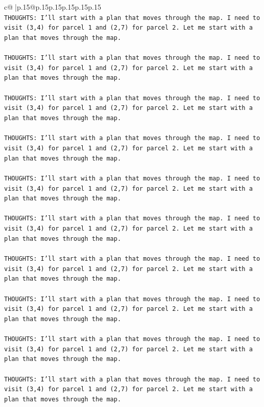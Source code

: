 \documentclass{article}
\begin{document}
{\begin{supertabular}{c@{$\;$}|p{.15\linewidth}@{}p{.15\linewidth}p{.15\linewidth}p{.15\linewidth}p{.15\linewidth}p{.15\linewidth}}
{{{\\ 
\texttt{THOUGHTS: I'll start with a plan that moves through the map. I need to visit (3,4) for parcel 1 and (2,7) for parcel 2. Let me start with a plan that moves through the map.} \\
\\ 
\texttt{THOUGHTS: I'll start with a plan that moves through the map. I need to visit (3,4) for parcel 1 and (2,7) for parcel 2. Let me start with a plan that moves through the map.} \\
\\ 
\texttt{THOUGHTS: I'll start with a plan that moves through the map. I need to visit (3,4) for parcel 1 and (2,7) for parcel 2. Let me start with a plan that moves through the map.} \\
\\ 
\texttt{THOUGHTS: I'll start with a plan that moves through the map. I need to visit (3,4) for parcel 1 and (2,7) for parcel 2. Let me start with a plan that moves through the map.} \\
\\ 
\texttt{THOUGHTS: I'll start with a plan that moves through the map. I need to visit (3,4) for parcel 1 and (2,7) for parcel 2. Let me start with a plan that moves through the map.} \\
\\ 
\texttt{THOUGHTS: I'll start with a plan that moves through the map. I need to visit (3,4) for parcel 1 and (2,7) for parcel 2. Let me start with a plan that moves through the map.} \\
\\ 
\texttt{THOUGHTS: I'll start with a plan that moves through the map. I need to visit (3,4) for parcel 1 and (2,7) for parcel 2. Let me start with a plan that moves through the map.} \\
\\ 
\texttt{THOUGHTS: I'll start with a plan that moves through the map. I need to visit (3,4) for parcel 1 and (2,7) for parcel 2. Let me start with a plan that moves through the map.} \\
\\ 
\texttt{THOUGHTS: I'll start with a plan that moves through the map. I need to visit (3,4) for parcel 1 and (2,7) for parcel 2. Let me start with a plan that moves through the map.} \\
\\ 
\texttt{THOUGHTS: I'll start with a plan that moves through the map. I need to visit (3,4) for parcel 1 and (2,7) for parcel 2. Let me start with a plan that moves through the map.} \\
}}}
\end{supertabular}}
\end{document}
